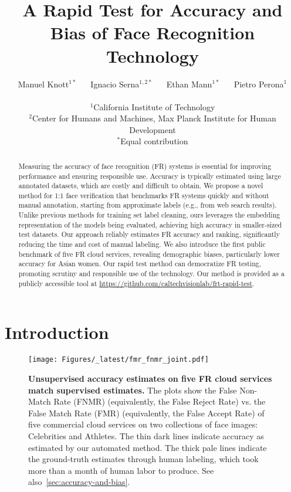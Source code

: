 \documentclass[10pt,twocolumn,letterpaper]{article}
\begin{document}
\title{A Rapid Test for Accuracy and Bias of Face Recognition Technology}

\author{
Manuel Knott$^{1*}$
~~
Ignacio Serna$^{1,2*}$
~~
Ethan Mann$^{1*}$
~~
Pietro Perona$^{1}$
\\\\
$^{1}$California Institute of Technology
\\
$^{2}$Center for Humans and Machines, Max Planck Institute for Human Development
\\
$^{*}$Equal contribution
}

\maketitle

\begin{abstract}
Measuring the accuracy of face recognition (FR) systems is essential for improving performance and ensuring responsible use. Accuracy is typically estimated using large annotated datasets, which are costly and difficult to obtain. We propose a novel method for 1:1 face verification that benchmarks FR systems quickly and without manual annotation, starting from approximate labels (e.g., from web search results). Unlike previous methods for training set label cleaning, ours leverages the embedding representation of the models being evaluated, achieving high accuracy in smaller-sized test datasets. Our approach reliably estimates FR accuracy and ranking, significantly reducing the time and cost of manual labeling. We also introduce the first public benchmark of five FR cloud services, revealing demographic biases, particularly lower accuracy for Asian women. Our rapid test method can democratize FR testing, promoting scrutiny and responsible use of the technology.
Our method is provided as a publicly accessible tool at \href{https://github.com/caltechvisionlab/frt-rapid-test}{https://github.com/caltechvisionlab/frt-rapid-test}.
\end{abstract}
\vspace{-2em}
\section{Introduction}
\label{sec:intro}

\begin{figure}[t!]
    \centering
    \texttt{[image: Figures/\_latest/fmr\_fnmr\_joint.pdf]}
    \caption{{\bf Unsupervised accuracy estimates on five FR cloud services match supervised estimates.} The plots show the False Non-Match Rate (FNMR) (equivalently, the False Reject Rate) vs. the False Match Rate (FMR)  (equivalently, the False Accept Rate) of five commercial cloud services on two collections of face images: Celebrities and Athletes. The thin dark lines indicate accuracy as estimated by our automated method. The thick pale lines indicate the ground-truth estimates through human labeling, which took more than a month of human labor to produce. See also~\cref{sec:accuracy-and-bias}.}
    \label{fig:accuracy}
\end{figure}
\end{document}
